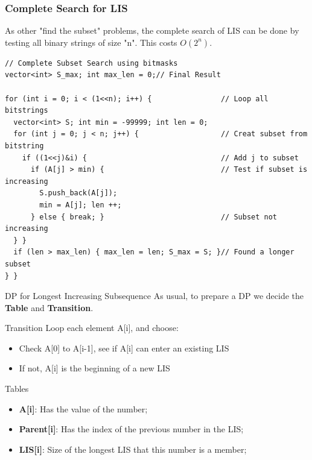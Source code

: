 \begin{frame}[fragile]
  \frametitle{Complete Search for LIS}

  As other "find the subset" problems, the complete search of LIS can be done by testing all binary strings of size "n". This costs $O(2^n)$.
  \smallskip

  \begin{block}{}
    {\smaller
\begin{verbatim}
// Complete Subset Search using bitmasks
vector<int> S_max; int max_len = 0;// Final Result

for (int i = 0; i < (1<<n); i++) {                // Loop all bitstrings
  vector<int> S; int min = -99999; int len = 0;
  for (int j = 0; j < n; j++) {                   // Creat subset from bitstring
    if ((1<<j)&i) {                               // Add j to subset
      if (A[j] > min) {                           // Test if subset is increasing
        S.push_back(A[j]);
        min = A[j]; len ++;
      } else { break; }                           // Subset not increasing
  } }
  if (len > max_len) { max_len = len; S_max = S; }// Found a longer subset
} }
\end{verbatim}
    }
  \end{block}
\end{frame}

\begin{frame}{DP for Longest Increasing Subsequence}
  As usual, to prepare a DP we decide the {\bf Table} and {\bf Transition}.

  \begin{block}{Transition}
    Loop each element A[i], and choose:
    \begin{itemize}
      \item Check A[0] to A[i-1], see if A[i] can enter an existing LIS
      \item If not, A[i] is the beginning of a new LIS
    \end{itemize}
  \end{block}

  \begin{exampleblock}{Tables}
    \begin{itemize}
      \item {\bf A[i]}: Has the value of the number;
      \item {\bf Parent[i]}: Has the index of the previous number in the LIS;
      \item {\bf LIS[i]}: Size of the longest LIS that this number is a member;
    \end{itemize}
  \end{exampleblock}
\end{frame}

